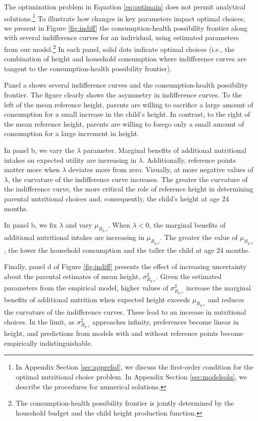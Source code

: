 The optimization problem in Equation \eqref{eq:optimain} does not permit analytical solutions.\footnote{In Appendix Section \ref{sec:apprefsd}, we discuss the first-order condition for the optimal nutritional choice problem. In Appendix Section \ref{sec:modelsolu}, we describe the procedures for numerical solutions.} To illustrate how changes in key parameters impact optimal choices, we present in Figure \ref{fig:indiff} the consumption-health possibility frontier along with several indifference curves for an individual, using estimated parameters from our model.\footnote{The consumption-health possibility frontier is jointly determined by the household budget and the child height production function.} In each panel, solid dots indicate optimal choices (i.e., the combination of height and household consumption where indifference curves are tangent to the consumption-health possibility frontier).

Panel a shows several indifference curves and the consumption-health possibility frontier. The figure clearly shows the asymmetry in indifference curves. To the left of the mean reference height, parents are willing to sacrifice a large amount of consumption for a small increase in the child's height. In contrast, to the right of the mean reference height, parents are willing to forego only a small amount of consumption for a large increment in height.

In panel b, we vary the $\lambda$ parameter. Marginal benefits of additional nutritional intakes on expected utility are increasing in $\lambda$. Additionally, reference points matter more when $\lambda$ deviates more from zero. Visually, at more negative values of $\lambda$, the curvature of the indifference curve increases. The greater the curvature of the indifference curve, the more critical the role of reference height in determining parental nutritional choices and, consequently, the child's height at age 24 months.

In panel b, we fix $\lambda$ and vary $\mu_{R_{y,v}}$. When $\lambda<0$, the marginal benefits of additional nutritional intakes are increasing in $\mu_{R_{y,v}}$. The greater the value of $\mu_{R_{y,v}}$, the lower the household consumption and the taller the child at age 24 months.

Finally, panel d of Figure \ref{fig:indiff} presents the effect of increasing uncertainty about the parental estimates of mean height, $\sigma^2_{R_{y,v}}$. Given the estimated parameters from the empirical model, higher values of $\sigma^2_{R_{y,v}}$ increase the marginal benefits of additional nutrition when expected height exceeds $\mu_{R_{y,v}}$ and reduces the curvature of the indifference curves. These lead to an increase in nutritional choices. In the limit, as $\sigma^2_{R_{y,v}}$ approaches infinity, preferences become linear in height, and predictions from models with and without reference points become empirically indistinguishable.

